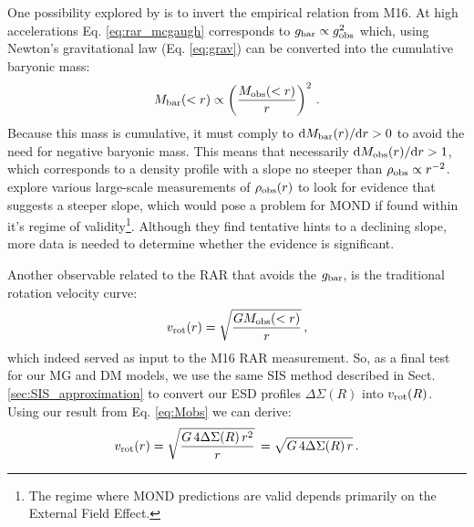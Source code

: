 \documentclass[usenatbib]{mnras}
\newcommand{\un}[1]{_{\rm #1}}
\begin{document}
One possibility explored by \cite{oman2020} is to invert the empirical relation from M16. At high accelerations Eq. \ref{eq:rar_mcgaugh} corresponds to $g\un{bar} \propto g\un{obs}^2$ which, using Newton's gravitational law (Eq. \ref{eq:grav}) can be converted into the cumulative baryonic mass:
\begin{equation}
M\un{bar}(<r) \propto  \left( \frac{M\un{obs}(<r)}{r} \right)^2 \, .
\end{equation}
Because this mass is cumulative, it must comply to ${\rm d}M\un{bar}(r)/{\rm d}r > 0$ to avoid the need for negative baryonic mass. This means that necessarily ${\rm d}M\un{obs}(r)/{\rm d}r > 1$, which corresponds to a density profile with a slope no steeper than $\rho\un{obs} \propto r^{-2}$. \cite{oman2020} explore various large-scale measurements of $\rho\un{obs}(r)$ to look for evidence that suggests a steeper slope, which would pose a problem for MOND if found within it's regime of validity\footnote{The regime where MOND predictions are valid depends primarily on the External Field Effect.}. Although they find tentative hints to a declining slope, more data is needed to determine whether the evidence is significant.

Another observable related to the RAR that avoids the $g\un{bar}$, is the traditional rotation velocity curve:
\begin{equation}
v\un{rot}(r) = \sqrt{\frac{G M\un{obs}(<r)}{r}} \, ,
\end{equation}
which indeed served as input to the M16 RAR measurement. So, as a final test for our MG and DM models, we use the same SIS method described in Sect. \ref{sec:SIS_approximation} to convert our ESD profiles $\Delta\Sigma(R)$ into $v\un{rot}(R)$. Using our result from Eq. \ref{eq:Mobs} we can derive:
\begin{equation}
v\un{rot}(r) = \sqrt{\frac{G \, 4 \Delta\Sigma(R) \, r^2}{r}} \, = \sqrt{G \, 4 \Delta\Sigma(R) \, r} \, .
\end{equation}
\end{document}

